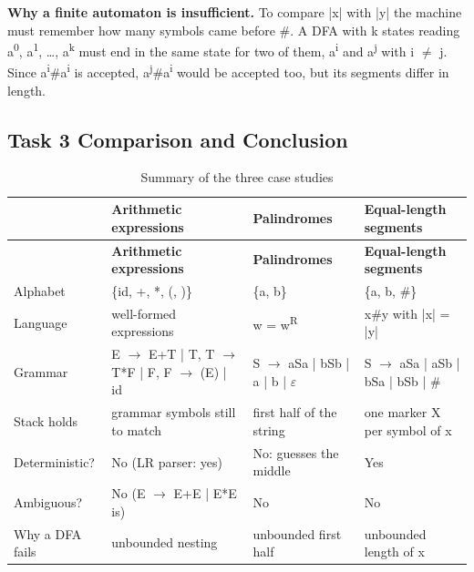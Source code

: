 \documentclass[12pt,a4paper]{article}
\begin{document}
\textbf{Why a finite automaton is insufficient.} To compare |x| with |y| the machine must remember how many symbols came before \#. A DFA with k states reading a\textsuperscript{0}, a\textsuperscript{1}, \ldots{}, a\textsuperscript{k} must end in the same state for two of them, a\textsuperscript{i} and a\textsuperscript{j} with i \ensuremath{\neq} j. Since a\textsuperscript{i}\#a\textsuperscript{i} is accepted, a\textsuperscript{j}\#a\textsuperscript{i} would be accepted too, but its segments differ in length.

\subsection{Task 3 Comparison and Conclusion}

{\footnotesize
\begin{longtable}{|>{\raggedright\arraybackslash}p{}|>{\raggedright\arraybackslash}p{}|>{\raggedright\arraybackslash}p{}|>{\raggedright\arraybackslash}p{}|}
\caption[Summary of the three case studies]{Summary of the three case studies}\label{tab:t3_compare}\\
\hline
\rowcolor{hdr} & \textbf{Arithmetic expressions} & \textbf{Palindromes} & \textbf{Equal-length segments}\\ \hline
\endfirsthead
\hline
\rowcolor{hdr} & \textbf{Arithmetic expressions} & \textbf{Palindromes} & \textbf{Equal-length segments}\\ \hline
\endhead
Alphabet & \{id, +, *, (, )\} & \{a, b\} & \{a, b, \#\}\\ \hline
Language & well-formed expressions & w = w\textsuperscript{R} & x\#y with |x| = |y|\\ \hline
Grammar & E \ensuremath{\rightarrow} E+T | T, T \ensuremath{\rightarrow} T*F | F, F \ensuremath{\rightarrow} (E) | id & S \ensuremath{\rightarrow} aSa | bSb | a | b | \ensuremath{\varepsilon} & S \ensuremath{\rightarrow} aSa | aSb | bSa | bSb | \#\\ \hline
Stack holds & grammar symbols still to match & first half of the string & one marker X per symbol of x\\ \hline
Deterministic? & No (LR parser: yes) & No: guesses the middle & Yes\\ \hline
Ambiguous? & No (E \ensuremath{\rightarrow} E+E | E*E is) & No & No\\ \hline
Why a DFA fails & unbounded nesting & unbounded first half & unbounded length of x\\ \hline
\end{longtable}}
\end{document}
